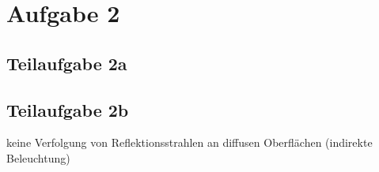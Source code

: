 \documentclass[a4paper]{scrartcl}
\begin{document}
\section*{Aufgabe 2}
\newcommand\raytracingscene{
	\node[above left] at (0.8,1) {Kamera};
	\fill[gray] (0.8,0) ellipse[x radius=0.2,y radius=0.8];
	\draw[thick] (1,-1) -- (0,0) -- (1,1);
	
	\node[fill=gray,rectangle,anchor=north west,rotate=90,minimum width=2.3cm,minimum height=0.8cm] (diffus1) at (3.5,-0.7) {diffus};
	\node[fill=gray,rectangle,anchor=north west,rotate=90,minimum width=5.1cm,minimum height=0.8cm] (diffus2) at (7.0,1.6)  {diffus};
	\node[fill=gray,rectangle,anchor=north west,rotate=45,minimum width=2.2cm,draw] (spiegelnd) at (5.5,-3.5) {spiegelnd};
	
	\draw (10.2,0.7) coordinate[label={[xshift=0.7cm]right:Punktlicht}] (light) circle[radius=0.3]
		+(-0.3, 0.3) -- +(-0.6, 0.6) +(0.0, 0.4) -- +(0.0, 0.7) +(0.3, 0.3) -- +(0.6, 0.6)
		+(-0.4, 0.0) -- +(-0.7, 0.0)                            +(0.4, 0.0) -- +(0.7, 0.0)
		+(-0.3,-0.3) -- +(-0.6,-0.6) +(0.0,-0.4) -- +(0.0,-0.7) +(0.3,-0.3) -- +(0.6,-0.6);
}
\subsection*{Teilaufgabe 2a}

\subsection*{Teilaufgabe 2b}

keine Verfolgung von Reflektionsstrahlen an diffusen Oberflächen (indirekte Beleuchtung)
\end{document}
